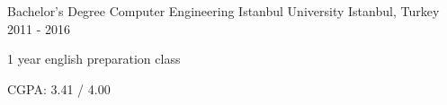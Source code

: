 

\begin{cventries}

  \cventry
    {Bachelor's Degree Computer Engineering} %
    {Istanbul University} %
    {Istanbul, Turkey} %
    {2011 - 2016} %
    {
      \begin{cvitems} %
        \item {1 year english preparation class}
        \item {CGPA: 3.41 / 4.00}
      \end{cvitems}
    }

\end{cventries}
